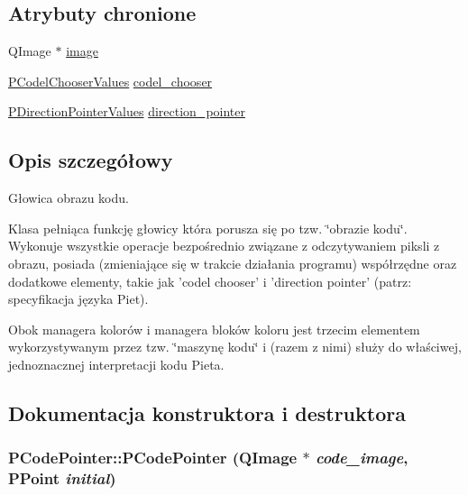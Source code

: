 \subsection*{Atrybuty chronione}
\begin{CompactItemize}
\item 
QImage $\ast$ \hyperlink{classPCodePointer_9f6689e6425046abd85001f915ba1221}{image}
\item 
\hyperlink{penums_8h_59dc57d526e2ce263bdf851c0d4fef3e}{PCodelChooserValues} \hyperlink{classPCodePointer_a3d7ea2563c9e1363ddcb0fb19b35f5a}{codel\_\-chooser}
\item 
\hyperlink{penums_8h_6d3256570150238c718cbbb5f81c82df}{PDirectionPointerValues} \hyperlink{classPCodePointer_b285be0011b9b5c8b35bd1ba27ee935f}{direction\_\-pointer}
\end{CompactItemize}


\subsection{Opis szczegółowy}
Głowica obrazu kodu. 

Klasa pełniąca funkcję głowicy która porusza się po tzw. \char`\"{}obrazie kodu\char`\"{}. Wykonuje wszystkie operacje bezpośrednio związane z odczytywaniem piksli z obrazu, posiada (zmieniające się w trakcie działania programu) współrzędne oraz dodatkowe elementy, takie jak 'codel chooser' i 'direction pointer' (patrz: specyfikacja języka Piet).

Obok managera kolorów i managera bloków koloru jest trzecim elementem wykorzystywanym przez tzw. \char`\"{}maszynę kodu\char`\"{} i (razem z nimi) służy do właściwej, jednoznacznej interpretacji kodu Pieta. 

\subsection{Dokumentacja konstruktora i destruktora}
\hypertarget{classPCodePointer_cd5cd1cd86ff9cf89ac6d2aae5cb52d8}{
\subsubsection[{PCodePointer}]{\setlength{\rightskip}{0pt plus 5cm}PCodePointer::PCodePointer (QImage $\ast$ {\em code\_\-image}, \/  PPoint {\em initial})}}
\label{classPCodePointer_cd5cd1cd86ff9cf89ac6d2aae5cb52d8}


